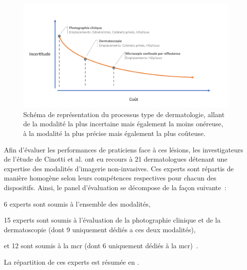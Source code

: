 \begin{figure}[H]
    \centering
    \includegraphics[width=\linewidth]{contents/chapter_4/resources/scheme_devices_location.pdf}
    \caption{Schéma de représentation du processus type de dermatologie, allant de la modalité la plus incertaine mais également la moins onéreuse, à la modalité la plus précise mais également la plus coûteuse.}
    \label{fig:scheme_devices_location}
\end{figure}\par

\addtocounter{footnote}{1}
\addtocounter{footnote}{1}
\addtocounter{footnote}{1}

Afin d'évaluer les performances de praticiens face à ces lésions, les investigateurs de l'étude de Cinotti et al. ont eu recours à 21 dermatologues détenant une expertise des modalités d'imagerie non-invasives. Ces experts sont répartis de manière homogène selon leurs compétences respectives pour chacun des dispositifs. Ainsi, le panel d'évaluation se décompose de la façon suivante~:~
\begin{inlinerate}
    \item 6 experts sont soumis à l'ensemble des modalités,
    \item 15 experts sont soumis à l'évaluation de la photographie clinique et de la dermatoscopie (dont 9 uniquement dédiés a ces deux modalités),
    \item et 12 sont soumis à la \gls{mcr} (dont 6 uniquement dédiés à la \gls{mcr})~\cite{Cinotti2018}.
\end{inlinerate}
La répartition de ces experts est résumée en .\par

